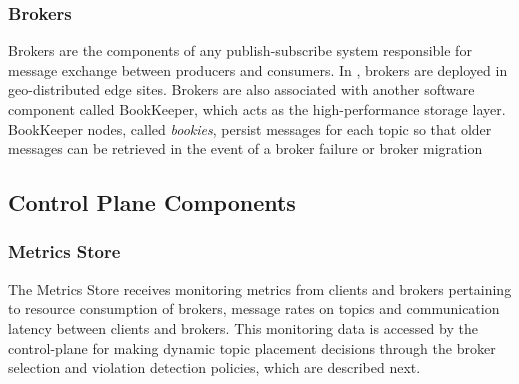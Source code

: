 \subsubsection{Brokers}
Brokers are the components of any publish-subscribe system responsible for message exchange between producers and consumers. In \epulsar, brokers are deployed in geo-distributed edge sites. Brokers are also associated with another software component called BookKeeper, which acts as the high-performance storage layer. BookKeeper nodes, called \textit{bookies}, persist messages for each topic so that older messages can be retrieved in the event of a broker failure or broker migration 
\subsection{Control Plane Components}
\subsubsection{Metrics Store}
The Metrics Store receives monitoring metrics from clients and brokers pertaining to resource consumption of brokers, message rates on topics and communication latency between clients and brokers. This monitoring data is accessed by the control-plane for making dynamic topic placement decisions through the broker selection and violation detection policies, which are described next.
